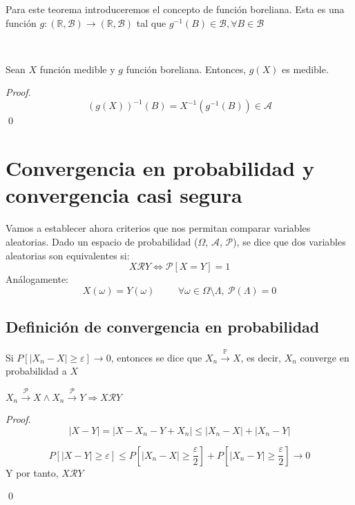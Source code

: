 Para este teorema introduceremos el concepto de función boreliana. Esta es una función $g:(\mathbb{R},\mathcal{B})\to(\mathbb{R},\mathcal{B})$ tal que $g^{-1}(B)\in \mathcal{B}, \forall B\in\mathcal{B}$

\begin{theorem}
  \
  
Sean $X$ función medible y $g$ función boreliana. Entonces, $g(X)$ es medible.
\end{theorem}

\begin{proof}
$$(g(X))^{-1}(B)=X^{-1}(g^{-1}(B))\in \mathcal{A}$$
\qed
\end{proof}

\section{Convergencia en probabilidad y convergencia casi segura}

Vamos a establecer ahora criterios que nos permitan comparar variables aleatorias. Dado un espacio de probabilidad ($\Omega$, $\mathcal{A}$, $\mathcal{P}$), se dice que dos variables aleatorias son equivalentes si:
$$ X\mathcal{R}Y \Leftrightarrow \mathcal{P}[X = Y] = 1$$
Análogamente:
$$X(\omega) = Y(\omega) \hspace{1cm} \forall \omega \in \Omega \setminus \Lambda, \  \mathcal{P}(\Lambda) = 0$$

\subsection{Definición de convergencia en probabilidad}

Si $P[|X_n- X| \geq \varepsilon]\rightarrow 0$, entonces se dice que $X_n\stackrel{\mathbb{P}}{\longrightarrow} X$, es decir, $X_n$ converge en probabilidad a $X$\\

\begin{lemma}
$X_n\stackrel{\mathcal{P}}{\longrightarrow} X \wedge X_n\stackrel{\mathcal{P}}{\longrightarrow} Y \Longrightarrow X\mathcal{R}Y$\\
\end{lemma}

\begin{proof}
$$|X-Y |=|X - X_n - Y + X_n | \leq |X_n - X|+| X_n-Y |$$

$$P[|X - Y| \geq \varepsilon] \leq P[|X_n - X | \geq \frac{\varepsilon}{2} ] + P[| X_n - Y | \geq \frac{\varepsilon}{2}] \rightarrow 0$$
Y por tanto, $X \mathcal{R} Y$

\qed
\end{proof}

